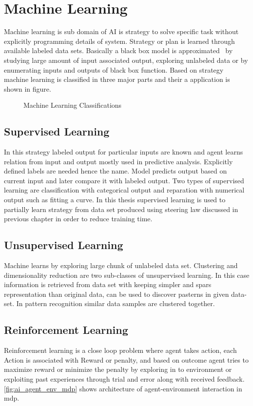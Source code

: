 \section{Machine Learning}
Machine learning is sub domain of AI is strategy to solve specific task without explicitly programming details of system. Strategy or plan is learned through available labeled data sets. Basically a black box model is approximated \ by studying large amount of input associated output, exploring unlabeled data or by enumerating inputs and outputs of black box function. Based on strategy machine learning is classified in three major parts and their a
application is shown in figure.
\begin{figure}
    \centering
    \scalebox{.5}{}
    \caption{Machine Learning Classifications}
    \label{fig:ML_Mindmap}
\end{figure}
\subsection{Supervised Learning}
In this strategy labeled output for particular inputs are known and agent learns relation from input and output mostly used in predictive analysis. Explicitly defined labels are needed hence the name. Model predicts output based on current input and later compare it with labeled output. Two types of supervised learning are classification with categorical output and reparation with numerical output such as fitting a curve. In this thesis supervised learning is used to partially learn strategy from data set produced using steering law discussed in previous chapter in order to reduce training time.

\subsection{Unsupervised Learning}
Machine learns by exploring large chunk of unlabeled data set. Clustering and dimensionality reduction are two sub-classes of unsupervised learning. In this case information is retrieved from data set with keeping simpler and spars representation than original data, can be used to discover pasterns in given data-set. In pattern recognition similar data samples are clustered together.

\subsection{Reinforcement Learning}
Reinforcement learning is a close loop problem where agent takes action, each \Gls{Action} is associated with \Gls{Reward} or penalty, and based on outcome agent tries to maximize reward or minimize the penalty by exploring in to environment or exploiting past experiences through trial and error along with received feedback. \autoref{fig:ai_agent_env_mdp} shows architecture of agent-environment interaction in \acrlong{mdp}.\cite{russell2010artificial}

